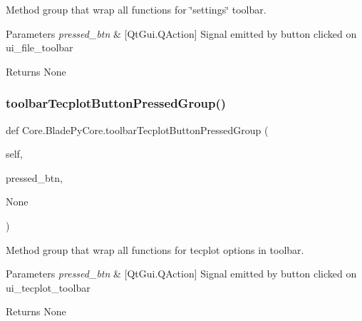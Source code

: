 Method group that wrap all functions for \char`\"{}settings\char`\"{} toolbar. 


\begin{DoxyParams}{Parameters}
{\em pressed\+\_\+btn} & \mbox{[}Qt\+Gui.\+Q\+Action\mbox{]} Signal emitted by button clicked on ui\+\_\+file\+\_\+toolbar \\
\hline
\end{DoxyParams}
\begin{DoxyReturn}{Returns}
None 
\end{DoxyReturn}
\hypertarget{a00079_aabfc46144de45158b8d9c8952cfa1a7d}{}\label{a00079_aabfc46144de45158b8d9c8952cfa1a7d} 
\subsubsection{\texorpdfstring{toolbar\+Tecplot\+Button\+Pressed\+Group()}{toolbarTecplotButtonPressedGroup()}}
{\footnotesize\ttfamily def Core.\+Blade\+Py\+Core.\+toolbar\+Tecplot\+Button\+Pressed\+Group (\begin{DoxyParamCaption}\item[{}]{self,  }\item[{}]{pressed\+\_\+btn,  }\item[{}]{None }\end{DoxyParamCaption})}



Method group that wrap all functions for tecplot options in toolbar. 


\begin{DoxyParams}{Parameters}
{\em pressed\+\_\+btn} & \mbox{[}Qt\+Gui.\+Q\+Action\mbox{]} Signal emitted by button clicked on ui\+\_\+tecplot\+\_\+toolbar \\
\hline
\end{DoxyParams}
\begin{DoxyReturn}{Returns}
None 
\end{DoxyReturn}
\hypertarget{a00079_ade955a1fc8334b12726d9f462ed25c62}{}\label{a00079_ade955a1fc8334b12726d9f462ed25c62} 
